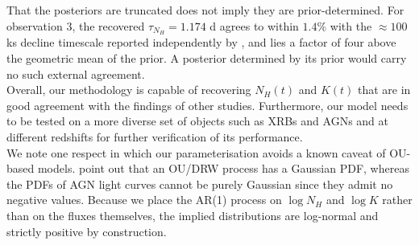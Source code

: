 \documentclass{aa}
\begin{document}
That the posteriors are truncated does not imply they are prior-determined. For observation 3, the recovered $\tau_{N_H} = 1.174$ d agrees to within $1.4\%$ with the $\approx 100$ ks decline timescale reported independently by \citet{Braito2014}, and lies a factor of four above the geometric mean of the prior. A posterior determined by its prior would carry no such external agreement. \\
Overall, our methodology is capable of recovering $N_H(t)$ and $K(t)$ that are in good agreement with the findings of other studies. Furthermore, our model needs to be tested on a more diverse set of objects such as XRBs and AGNs and at different redshifts for further verification of its performance. \\
We note one respect in which our parameterisation avoids a known caveat of OU-based models. \citet{Kankkunen2025} point out that an OU/DRW process has a Gaussian PDF, whereas the PDFs of AGN light curves cannot be purely Gaussian since they admit no negative values. Because we place the AR(1) process on $\log N_H$ and $\log K$ rather than on the fluxes themselves, the implied distributions are log-normal and strictly positive by construction. \\
\end{document}

